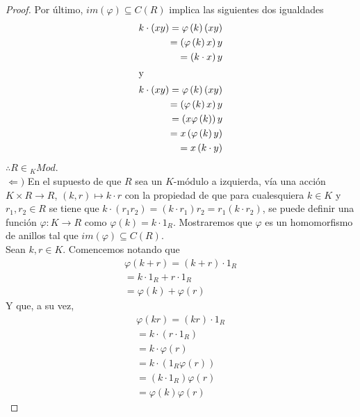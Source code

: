 \documentclass{article}
\newcommand{\lrprth}[1]{
    \left(#1\right)
}
\newcommand{\ringcenter}[1]{
    C\lrprth{#1}
}
\theoremstyle{definition}
\theoremstyle{plain}
\theoremstyle{plain}
\theoremstyle{definition}
\theoremstyle{definition}
\theoremstyle{definition}
\theoremstyle{definition}
\theoremstyle{definition}
\theoremstyle{definition}
\begin{document}
\begin{enumerate}[label=\textbf{Ej \arabic*.}]
\begin{proof}
		Por último, $im\lrprth{ \varphi } \subseteq \ringcenter{R}$ implica las siguientes dos igualdades
		\begin{align*}
			k \cdot \lrprth{xy}=\varphi \lrprth{k}\lrprth{xy}\\
			=\lrprth{ \varphi \lrprth{k}x}y\\
			=\lrprth{k \cdot x}y\\
			\intertext{y}
			k \cdot \lrprth{xy} = \varphi \lrprth{k}\lrprth{xy}\\
			=\lrprth{ \varphi \lrprth{k}x}y
			\\=\lrprth{x \varphi \lrprth{k}}y\\
			=x\lrprth{ \varphi \lrprth{k}y}\\
			=x\lrprth{k \cdot y}
		\end{align*}
		$\therefore R \in {}_{K}Mod$.\\
	
		$\boxed{\Leftarrow )}$ En el supuesto de que $R$ sea un $K$-módulo a izquierda, vía una acción $K \times R \longrightarrow R$, $\lrprth{k,r} \mapsto k \cdot r$ con la propiedad de que para cualesquiera $k \in K$ y $r_{1},r_{2} \in R$ se tiene que $k \cdot \lrprth{r_{1}r_{2}} = \lrprth{k \cdot r_{1}}r_{2} = r_{1} \lrprth{k \cdot r_{2}}$, se puede definir una función $\varphi : K \longrightarrow R$ como $\varphi \lrprth{k} = k \cdot 1_{R}$. Mostraremos que $\varphi$ es un homomorfismo de anillos tal que $im\lrprth{ \varphi } \subseteq \ringcenter{R}$.\\
	
		Sean $k,r \in K$. Comencemos notando que
		\begin{align*}
			\varphi \lrprth{k+r}=\lrprth{k+r}\cdot 1_{R}\\
			=k \cdot 1_{R}+r \cdot 1_{R}\\
			=\varphi\lrprth{k}+\varphi\lrprth{r}
		\end{align*}
		Y que, a su vez,
		\begin{align*}
			\varphi \lrprth{kr} = \lrprth{kr} \cdot 1_{R}\\
			= k \cdot \lrprth{r \cdot 1_{R}}\\
			= k \cdot \varphi \lrprth{r}\\
			= k \cdot \lrprth{1_{R} \varphi \lrprth{r}}\\
			= \lrprth{k \cdot 1_{R}} \varphi \lrprth{r}\\
			= \varphi \lrprth{k} \varphi \lrprth{r}
		\end{align*}


\end{proof}
\end{enumerate}
\end{document}
